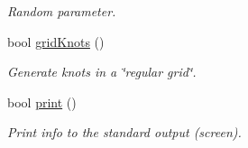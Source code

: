 \begin{CompactItemize}
\begin{CompactList}\small\item\em Random parameter. \item\end{CompactList}\item 
bool \hyperlink{classRectangleKnots_ec4183669ad966749af37ef39ea5aaed}{gridKnots} ()
\begin{CompactList}\small\item\em Generate knots in a \char`\"{}regular grid\char`\"{}. \item\end{CompactList}\item 
\hypertarget{classRectangleKnots_b191400ac70cc2fcd168de48b44f0172}{
bool \hyperlink{classRectangleKnots_b191400ac70cc2fcd168de48b44f0172}{print} ()}
\label{classRectangleKnots_b191400ac70cc2fcd168de48b44f0172}

\begin{CompactList}\small\item\em Print info to the standard output (screen). \item\end{CompactList}\end{CompactItemize}

